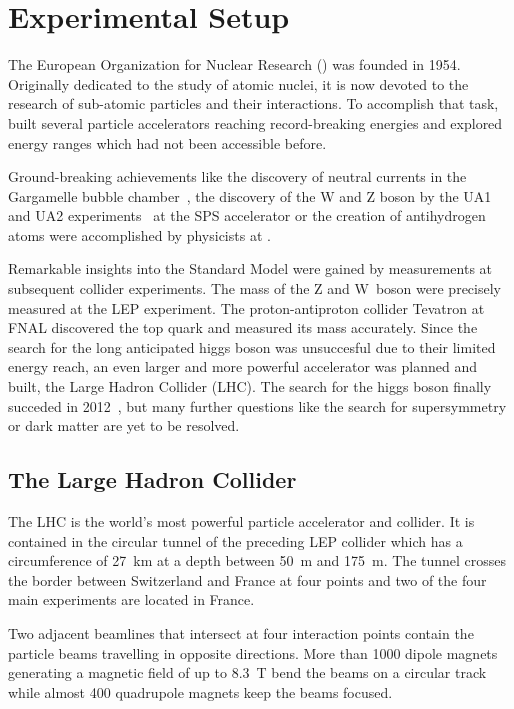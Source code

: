 
\chapter{Experimental Setup}
\label{sec:experimental_setup}

The European Organization for Nuclear Research (\CERN) was founded in 1954.
Originally dedicated to the study of atomic nuclei, it is now devoted to the
research of sub-atomic particles and their interactions. To accomplish that
task, \CERN built several particle accelerators reaching record-breaking
energies and explored energy ranges which had not been accessible before.

Ground-breaking achievements like the discovery of neutral currents in the
Gargamelle bubble chamber~\cite{Hasert:1973ff}, the discovery of the W and Z
boson by the UA1 and UA2 experiments~\cite{Arnison:1983rp} at the SPS
accelerator or the creation of antihydrogen atoms were accomplished by physicists at
\CERN.

Remarkable insights into the Standard Model were gained by measurements at
subsequent collider experiments. The mass of the Z and W~boson were precisely
measured at the LEP experiment. The proton-antiproton collider Tevatron at FNAL
discovered the top quark and measured its mass accurately. Since the search
for the long anticipated higgs boson was unsuccesful due to their limited energy
reach, an even larger and more powerful accelerator was planned and built, the
Large Hadron Collider (LHC). The search for the higgs boson finally succeded in
2012~\cite{Chatrchyan:2012xdj,Aad:2012tfa}, but many further questions like the
search for supersymmetry or dark matter are yet to be resolved.

\section{The Large Hadron Collider}

The LHC is the world's most powerful particle accelerator and collider. It
is contained in the circular tunnel of the preceding LEP collider which has a
circumference of \SI{27}{\kilo \meter} at a depth between \SI{50}{\meter} and
\SI{175}{\meter}.  The tunnel crosses the border between Switzerland and France
at four points and two of the four main experiments are located in France. 

Two adjacent beamlines that intersect at four interaction points contain the
particle beams travelling in opposite directions. More than 1000 dipole magnets
generating a magnetic field of up to \SI{8.3}{\tesla} bend the beams on
a circular track while almost 400 quadrupole magnets keep the beams focused. 


